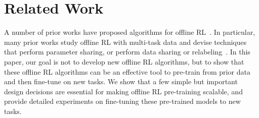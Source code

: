 \vspace{0.1cm}
\section{Related Work}
\label{sec:related}
\vspace{0.05cm}

A number of prior works have proposed algorithms for offline RL~\citep{fujimoto2018off,kumar2019stabilizing,kumar2020conservative,kostrikov2021offline,kostrikov2021iql,wu2019behavior,jaques2019way,fujimoto2021minimalist,siegel2020keep}. In particular, many prior works study offline RL with multi-task data and devise techniques that perform parameter sharing\citep{wilson2007multi, parisotto2015actor, teh2017distral, espeholt2018impala, hessel2019multi}, or perform data sharing or relabeling~\citep{yu2021conservative,andrychowicz2017hindsight,yu2022leverage,kalashnikov2021mt,xie2021lifelong}. In this paper, our goal is not to develop new offline RL algorithms, but to show that these offline RL algorithms can be an effective tool to pre-train from prior data and then fine-tune on new tasks. We show that a few simple but important design decisions are essential for making offline RL pre-training scalable, and provide detailed experiments on fine-tuning these pre-trained models to new tasks.

